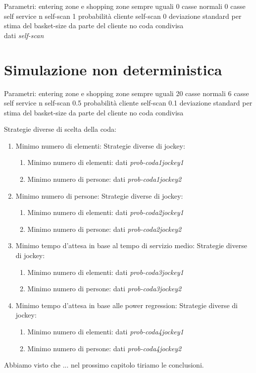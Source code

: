 Parametri:
entering zone e shopping zone sempre uguali
0 casse normali
0 casse self service
n self-scan
1 probabilità cliente self-scan
0 deviazione standard per stima del basket-size da parte del cliente
no coda condivisa
\\
dati \textit{self-scan}

\section{Simulazione non deterministica}

Parametri:
entering zone e shopping zone sempre uguali
20 casse normali
6 casse self service
n self-scan
0.5 probabilità cliente self-scan
0.1 deviazione standard per stima del basket-size da parte del cliente
no coda condivisa

Strategie diverse di scelta della coda:
\begin{enumerate}
	\item Minimo numero di elementi:
	Strategie diverse di jockey:
	\begin{enumerate}
		\item Minimo numero di elementi: dati \textit{prob-coda1jockey1}
		\item Minimo numero di persone: dati \textit{prob-coda1jockey2}
	\end{enumerate}
	\item Minimo numero di persone:
	Strategie diverse di jockey:
	\begin{enumerate}
		\item Minimo numero di elementi: dati \textit{prob-coda2jockey1}
		\item Minimo numero di persone: dati \textit{prob-coda2jockey2}
	\end{enumerate}
	\item Minimo tempo d'attesa in base al tempo di servizio medio:
	Strategie diverse di jockey:
	\begin{enumerate}
		\item Minimo numero di elementi: dati \textit{prob-coda3jockey1}
		\item Minimo numero di persone: dati \textit{prob-coda3jockey2}
	\end{enumerate}
	\item Minimo tempo d'attesa in base alle power regression: Strategie diverse di jockey:
	\begin{enumerate}
		\item Minimo numero di elementi: dati \textit{prob-coda4jockey1}
		\item Minimo numero di persone: dati \textit{prob-coda4jockey2}
	\end{enumerate}
\end{enumerate}

\vspace*{1\baselineskip}

Abbiamo visto che ... nel prossimo capitolo tiriamo le conclusioni.